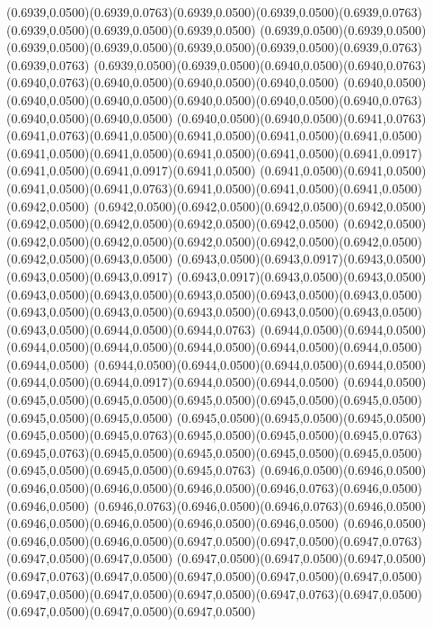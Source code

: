 (0.6939,0.0500)(0.6939,0.0763)(0.6939,0.0500)(0.6939,0.0500)(0.6939,0.0763)(0.6939,0.0500)(0.6939,0.0500)(0.6939,0.0500)
(0.6939,0.0500)(0.6939,0.0500)(0.6939,0.0500)(0.6939,0.0500)(0.6939,0.0500)(0.6939,0.0500)(0.6939,0.0763)(0.6939,0.0763)
(0.6939,0.0500)(0.6939,0.0500)(0.6940,0.0500)(0.6940,0.0763)(0.6940,0.0763)(0.6940,0.0500)(0.6940,0.0500)(0.6940,0.0500)
(0.6940,0.0500)(0.6940,0.0500)(0.6940,0.0500)(0.6940,0.0500)(0.6940,0.0500)(0.6940,0.0763)(0.6940,0.0500)(0.6940,0.0500)
(0.6940,0.0500)(0.6940,0.0500)(0.6941,0.0763)(0.6941,0.0763)(0.6941,0.0500)(0.6941,0.0500)(0.6941,0.0500)(0.6941,0.0500)
(0.6941,0.0500)(0.6941,0.0500)(0.6941,0.0500)(0.6941,0.0500)(0.6941,0.0917)(0.6941,0.0500)(0.6941,0.0917)(0.6941,0.0500)
(0.6941,0.0500)(0.6941,0.0500)(0.6941,0.0500)(0.6941,0.0763)(0.6941,0.0500)(0.6941,0.0500)(0.6941,0.0500)(0.6942,0.0500)
(0.6942,0.0500)(0.6942,0.0500)(0.6942,0.0500)(0.6942,0.0500)(0.6942,0.0500)(0.6942,0.0500)(0.6942,0.0500)(0.6942,0.0500)
(0.6942,0.0500)(0.6942,0.0500)(0.6942,0.0500)(0.6942,0.0500)(0.6942,0.0500)(0.6942,0.0500)(0.6942,0.0500)(0.6943,0.0500)
(0.6943,0.0500)(0.6943,0.0917)(0.6943,0.0500)(0.6943,0.0500)(0.6943,0.0917)
\PST@Solid(0.6943,0.0917)(0.6943,0.0500)(0.6943,0.0500)(0.6943,0.0500)(0.6943,0.0500)(0.6943,0.0500)(0.6943,0.0500)(0.6943,0.0500)
(0.6943,0.0500)(0.6943,0.0500)(0.6943,0.0500)(0.6943,0.0500)(0.6943,0.0500)(0.6943,0.0500)(0.6944,0.0500)(0.6944,0.0763)
(0.6944,0.0500)(0.6944,0.0500)(0.6944,0.0500)(0.6944,0.0500)(0.6944,0.0500)(0.6944,0.0500)(0.6944,0.0500)(0.6944,0.0500)
(0.6944,0.0500)(0.6944,0.0500)(0.6944,0.0500)(0.6944,0.0500)(0.6944,0.0500)(0.6944,0.0917)(0.6944,0.0500)(0.6944,0.0500)
(0.6944,0.0500)(0.6945,0.0500)(0.6945,0.0500)(0.6945,0.0500)(0.6945,0.0500)(0.6945,0.0500)(0.6945,0.0500)(0.6945,0.0500)
(0.6945,0.0500)(0.6945,0.0500)(0.6945,0.0500)(0.6945,0.0500)(0.6945,0.0763)(0.6945,0.0500)(0.6945,0.0500)(0.6945,0.0763)
(0.6945,0.0763)(0.6945,0.0500)(0.6945,0.0500)(0.6945,0.0500)(0.6945,0.0500)(0.6945,0.0500)(0.6945,0.0500)(0.6945,0.0763)
(0.6946,0.0500)(0.6946,0.0500)(0.6946,0.0500)(0.6946,0.0500)(0.6946,0.0500)(0.6946,0.0763)(0.6946,0.0500)(0.6946,0.0500)
(0.6946,0.0763)(0.6946,0.0500)(0.6946,0.0763)(0.6946,0.0500)(0.6946,0.0500)(0.6946,0.0500)(0.6946,0.0500)(0.6946,0.0500)
(0.6946,0.0500)(0.6946,0.0500)(0.6946,0.0500)(0.6947,0.0500)(0.6947,0.0500)(0.6947,0.0763)(0.6947,0.0500)(0.6947,0.0500)
(0.6947,0.0500)(0.6947,0.0500)(0.6947,0.0500)(0.6947,0.0763)(0.6947,0.0500)(0.6947,0.0500)(0.6947,0.0500)(0.6947,0.0500)
(0.6947,0.0500)(0.6947,0.0500)(0.6947,0.0500)(0.6947,0.0763)(0.6947,0.0500)(0.6947,0.0500)(0.6947,0.0500)(0.6947,0.0500)
